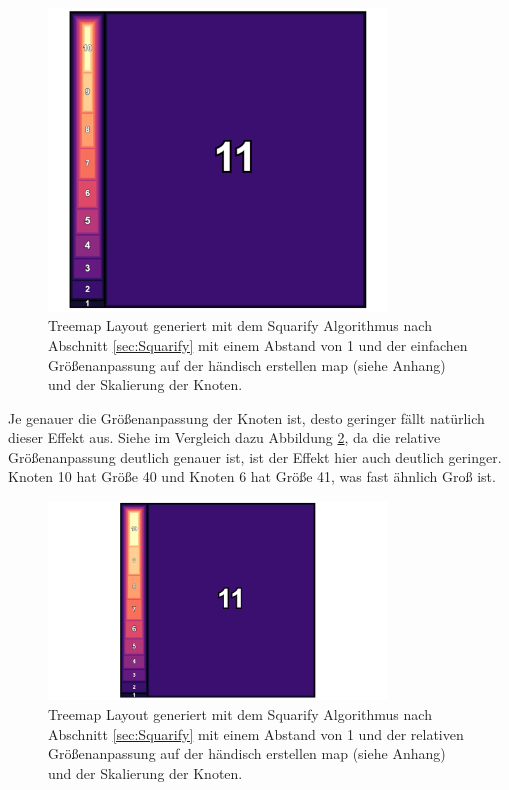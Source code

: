 \begin{figure}
    \centering
    \includegraphics[width=0.8\textwidth]{images/simpleIncreaseMarginOneScale.png}
    \caption{Treemap Layout generiert mit dem Squarify Algorithmus nach Abschnitt \ref{sec:Squarify} mit einem Abstand von 1 und der einfachen Größenanpassung auf der händisch erstellen map (siehe Anhang) und der Skalierung der Knoten.}
    \label{fig:simpleIncreaseMarginOneScale}
\end{figure}

Je genauer die Größenanpassung der Knoten ist, desto geringer fällt natürlich dieser Effekt aus. Siehe im Vergleich dazu Abbildung \ref{fig:relativeIncreaseMarginOneScale}, da die relative Größenanpassung deutlich genauer ist, ist der Effekt hier auch deutlich geringer. Knoten 10 hat Größe 40 und Knoten 6 hat Größe 41, was fast ähnlich Groß ist.

\begin{figure}
    \centering
    \includegraphics[width=0.8\textwidth]{images/increaseMarginOneScale.png}
    \caption{Treemap Layout generiert mit dem Squarify Algorithmus nach Abschnitt \ref{sec:Squarify} mit einem Abstand von 1 und der relativen Größenanpassung auf der händisch erstellen map (siehe Anhang) und der Skalierung der Knoten.}
    \label{fig:relativeIncreaseMarginOneScale}
\end{figure}

